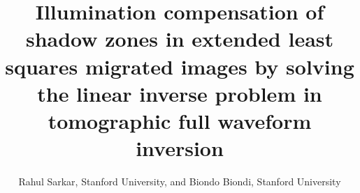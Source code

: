 \documentclass{segabs}
\begin{document}
\title{Illumination compensation of shadow zones in extended least squares migrated images by solving the linear inverse problem in tomographic full waveform inversion}

\author{Rahul Sarkar, Stanford University, and Biondo Biondi, Stanford University}


\maketitle

\vspace*{-0.7cm}

\vspace*{-0.7cm}

\vspace*{-0.8cm}

\vspace*{-0.4cm}

\vspace*{-0.6cm}

\vspace*{-0.4cm}


\twocolumn


\end{document}
